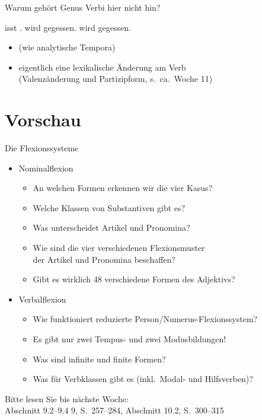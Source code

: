 \begin{frame}
  {Warum gehört Genus Verbi hier nicht hin?}
  \pause
  \begin{exe}
    \ex
    \begin{xlist}
      \ex {} \alert{isst} .
      \pause
      \ex {} \alert{wird} \alert{gegessen}.
      \pause
      \ex {} \alert{wird}  \alert{gegessen}.
    \end{xlist}
  \end{exe}
  \pause
  \Zeile
  \begin{itemize}[<+->]
    \item {} (wie analytische Tempora)
    \item eigentlich eine \alert{lexikalische} Änderung am Verb\\
      (Valenzänderung und Partizipform, s.\ ca.\ Woche 11)
  \end{itemize}
\end{frame}

\section{Vorschau}


\begin{frame}
  {Die Flexionssysteme}
  \pause
  \begin{itemize}[<+->]
    \item \alert{Nominalflexion}
      \begin{itemize}[<+->]
        \item An welchen Formen erkennen wir die vier Kasus?
        \item Welche Klassen von Substantiven gibt es?
        \item Was unterscheidet Artikel und Pronomina?
        \item Wie sind die \alert{vier} verschiedenen Flexionsmuster\\
          der Artikel und Pronomina beschaffen?
        \item Gibt es wirklich 48 verschiedene Formen des Adjektivs?
      \end{itemize}
      \Zeile
    \item \alert{Verbalflexion}
      \begin{itemize}[<+->]
        \item Wie funktioniert reduzierte Person\slash Numerus-Flexionssystem?
        \item Es gibt nur zwei Tempus- und zwei Modusbildungen!
        \item Was sind infinite und finite Formen?
        \item Was für Verbklassen gibt es (inkl.\ Modal- und Hilfsverben)?
      \end{itemize}
  \end{itemize}
  \pause
  \begin{center}
    Bitte lesen Sie bis nächste Woche:\\
    \alert{Abschnitt 9.2--9.4 9, S.~257--284, Abschnitt 10.2, S.~300--315}
  \end{center}
\end{frame}


